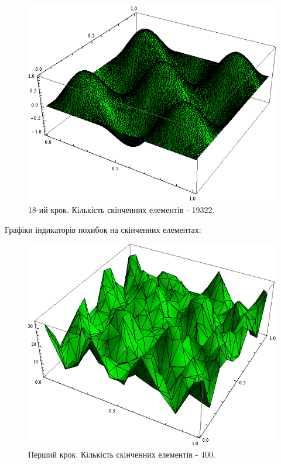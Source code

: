 \begin{figure}[H]
	\centering
    \includegraphics[scale=0.7]{problem1/my/solutions/18}
    \caption{18-ий крок. Кількість скінченних елементів - 19322.}
    \label{fig:p1_solution18}
\end{figure}
%
\clearpage
Графіки індикаторів похибок на скінченних елементах:
%
\begin{figure}[H]
	\centering
    \includegraphics[scale=0.8]{problem1/my/AEE/1}
    \caption{Перший крок. Кількість скінченних елементів - 400.}
    \label{fig:p1_aee1}
\end{figure}

